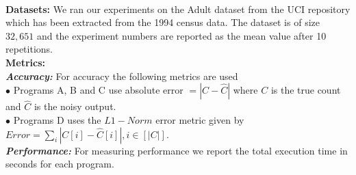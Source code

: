 \\\textbf{Datasets:}
We ran our experiments on the Adult dataset from the UCI repository \cite{UCI}  which has been extracted from the 1994 census data. The dataset is of size $32,651$ and the experiment numbers are reported as the mean value after 10 repetitions.
\\\textbf{Metrics:}
\\\textbf{\textit{Accuracy:}} For accuracy the following metrics are used
\\$\bullet$ Programs A, B and C use absolute error $ =|C-\hat{C}|$ where $C$ is the true count and $\hat{C}$ is the noisy output.\\ $\bullet$ Programs D uses the $L1-Norm$ error metric given  by $Error=\sum_{i}|C[i]-\hat{C}[i]|, i \in [|C|]$.\\
\textbf{\textit{Performance:}} For measuring performance we report the total execution time in seconds for each program.





